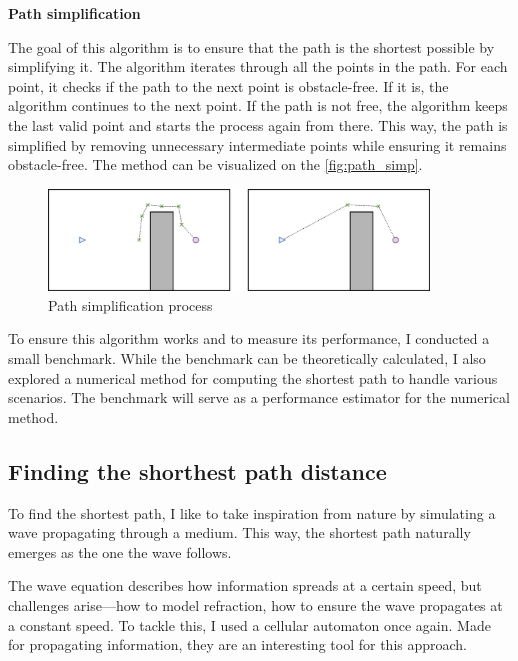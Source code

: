 \documentclass[../main.tex]{subfiles}
\begin{document}
\textbf{Path simplification}

The goal of this algorithm is to ensure that the path is the shortest possible by simplifying it. The algorithm iterates through all the points in the path. For each point, it checks if the path to the next point is obstacle-free. If it is, the algorithm continues to the next point. If the path is not free, the algorithm keeps the last valid point and starts the process again from there. This way, the path is simplified by removing unnecessary intermediate points while ensuring it remains obstacle-free. The method can be visualized on the \autoref{fig:path_simp}.

\begin{figure}[H]
	\centering
	\includegraphics[width=0.9\textwidth]{IMAGES/part3/shorten_path.png}
	\caption{Path simplification process}
	\label{fig:path_simp}
\end{figure}

To ensure this algorithm works and to measure its performance, I conducted a small benchmark. While the benchmark can be theoretically calculated, I also explored a numerical method for computing the shortest path to handle various scenarios. The benchmark will serve as a performance estimator for the numerical method.

\subsection{Finding the shorthest path distance}
To find the shortest path, I like to take inspiration from nature by simulating a wave propagating through a medium. This way, the shortest path naturally emerges as the one the wave follows.  

\vspace{1em}

The wave equation describes how information spreads at a certain speed, but challenges arise—how to model refraction, how to ensure the wave propagates at a constant speed. To tackle this, I used a cellular automaton once again. Made for propagating information, they are an interesting tool for this approach.\cite{tapia_2016}
\end{document}
